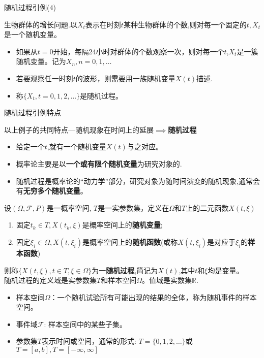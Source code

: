 \begin{frame}{随机过程引例(4)}
\begin{example}
	生物群体的增长问题.以$X_t$表示在时刻$t$某种生物群体的个数,则对每一个固定的$t,X_t$是一个随机变量。　
	\begin{itemize}
		\item 如果从$t=0$开始，每隔24小时对群体的个数观察一次，则对每一个$t$,$X_t$是一簇随机变量。记为$X_n,n=0,1,\dots$
		\item 若要观察任一时刻$t$的波形，则需要用一族随机变量$X(t)$描述. 
		\item 称$\{X_t,t=0,1,2,\dots\}$是随机过程。
	\end{itemize}	
\end{example}
\end{frame}

\begin{frame}{随机过程引例特点}
\begin{block}{以上例子的共同特点---随机现象在时间上的延展$\implies$\textbf{随机过程}}
	\begin{itemize}
		\item 给定一个$t$,就有一个随机变量$X(t)$与之对应。
		\item 概率论主要是以\textbf{一个或有限个随机变量}为研究对象的.
		\item 随机过程是概率论的``动力学''部分，研究对象为随时间演变的随机现象,通常会有\textbf{无穷多个随机变量}。
	\end{itemize}	
\end{block}
\end{frame}

\begin{frame}%
\begin{definition}[随机过程]
	设$(\Omega,\mathcal{F},P)$是一概率空间, $T$是一实参数集，定义在$\Omega$和$T$上的二元函数$X(t,\xi)$
	\begin{enumerate}
		\item 固定$t_k\in T,X(t_k,\xi)$是概率空间上的\textbf{随机变量};
		\item 固定$\xi_i\in\Omega,X(t,\xi_i)$是概率空间上的\textbf{随机函数}(或称$X(t,\xi_i)$是对应于$\xi_i$的\textbf{样本函数})
	\end{enumerate}
    则称$\{X(t,\xi),t\in T,\xi\in \Omega \}$为一\textbf{随机过程},简记为$X(t)$,其中$t$和$\xi$均是变量。\\
	随机过程的定义域是实参数集$T$和样本空间$\Omega$。值域是实数集$\mathbb{R}$.
	\begin{itemize}
		\item 样本空间$\Omega$：一个随机试验所有可能出现的结果的全体，称为随机事件的样本空间。\\
		\item 事件域$\mathcal{F}$: 样本空间中的某些子集。
		\item
		参数集$T$表示时间或空间，通常的形式: $T=\{0,1,2,\dots \}$或$T=[a,b],T=[-\infty,\infty]$
	\end{itemize}
	\end{definition}
\end{frame}

